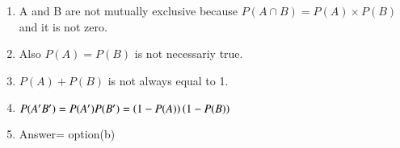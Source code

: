 \renewcommand{\theequation}{\theenumi}
\begin{enumerate}[label=\thesection.\arabic*.,ref=\thesection.\theenumi]
\item A and B are not mutually exclusive because $P(A \cap B)= P(A)\times P(B)$ and it is not zero.
\item Also $P(A) = P(B)$ is not necessariy true. 
\item $P(A) + P(B)$ is not always equal to 1.
\item $P(A'B') = P(A')P(B') = \left(1-P(A)\right)\left(1-P(B)\right)$
\item Answer= option(b)

\end{enumerate}